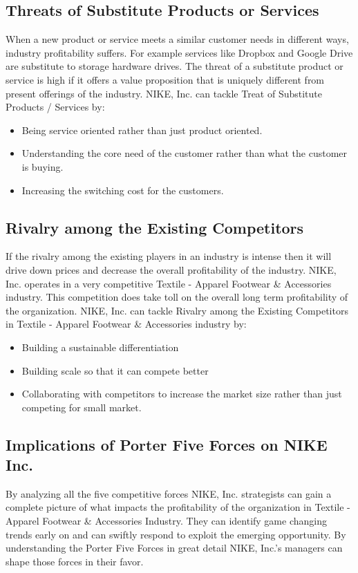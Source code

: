 \documentclass[a4paper, 12pt]{report}
\begin{document}
\subsection{Threats of Substitute Products or Services}
When a new product or service meets a similar customer needs in different ways, industry profitability suffers. For example services like Dropbox and Google Drive are substitute to storage hardware drives. The threat of a substitute product or service is high if it offers a value proposition that is uniquely different from present offerings of the industry.
NIKE, Inc. can tackle Treat of Substitute Products / Services by:
\begin{itemize}
    \item Being service oriented rather than just product oriented.
    \item Understanding the core need of the customer rather than what the customer is buying. 
    \item Increasing the switching cost for the customers.

\end{itemize}
\subsection{Rivalry among the Existing Competitors}
If the rivalry among the existing players in an industry is intense then it will drive down prices and decrease the overall profitability of the industry. NIKE, Inc. operates in a very competitive Textile - Apparel Footwear & Accessories industry. This competition does take toll on the overall long term profitability of the organization.
NIKE, Inc. can tackle Rivalry among the Existing Competitors in Textile - Apparel Footwear & Accessories industry by:
\begin{itemize}
    \item Building a sustainable differentiation
    \item Building scale so that it can compete better
    \item Collaborating with competitors to increase the market size rather than just competing for small market.
\end{itemize}
\subsection{Implications of Porter Five Forces on NIKE Inc.}
By analyzing all the five competitive forces NIKE, Inc. strategists can gain a complete picture of what impacts the profitability of the organization in Textile - Apparel Footwear \& Accessories Industry. They can identify game changing trends early on and can swiftly respond to exploit the emerging opportunity. By understanding the Porter Five Forces in great detail NIKE, Inc.'s managers can shape those forces in their favor.
\end{document}
